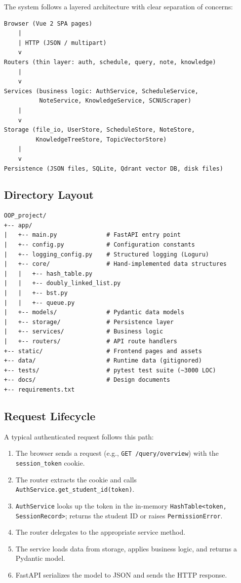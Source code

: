 \documentclass[12pt,a4paper]{article}
\begin{document}
The system follows a layered architecture with clear separation of concerns:

\begin{verbatim}
Browser (Vue 2 SPA pages)
    |
    | HTTP (JSON / multipart)
    v
Routers (thin layer: auth, schedule, query, note, knowledge)
    |
    v
Services (business logic: AuthService, ScheduleService,
          NoteService, KnowledgeService, SCNUScraper)
    |
    v
Storage (file_io, UserStore, ScheduleStore, NoteStore,
         KnowledgeTreeStore, TopicVectorStore)
    |
    v
Persistence (JSON files, SQLite, Qdrant vector DB, disk files)
\end{verbatim}

\subsection{Directory Layout}

\begin{lstlisting}[language={},caption={Project directory structure}]
OOP_project/
+-- app/
|   +-- main.py              # FastAPI entry point
|   +-- config.py            # Configuration constants
|   +-- logging_config.py    # Structured logging (Loguru)
|   +-- core/                # Hand-implemented data structures
|   |   +-- hash_table.py
|   |   +-- doubly_linked_list.py
|   |   +-- bst.py
|   |   +-- queue.py
|   +-- models/              # Pydantic data models
|   +-- storage/             # Persistence layer
|   +-- services/            # Business logic
|   +-- routers/             # API route handlers
+-- static/                  # Frontend pages and assets
+-- data/                    # Runtime data (gitignored)
+-- tests/                   # pytest test suite (~3000 LOC)
+-- docs/                    # Design documents
+-- requirements.txt
\end{lstlisting}

\subsection{Request Lifecycle}

A typical authenticated request follows this path:
\begin{enumerate}[nosep]
    \item The browser sends a request (e.g., \texttt{GET /query/overview}) with the \texttt{session\_token} cookie.
    \item The router extracts the cookie and calls \texttt{AuthService.get\_student\_id(token)}.
    \item \texttt{AuthService} looks up the token in the in-memory \texttt{HashTable<token, SessionRecord>}; returns the student ID or raises \texttt{PermissionError}.
    \item The router delegates to the appropriate service method.
    \item The service loads data from storage, applies business logic, and returns a Pydantic model.
    \item FastAPI serializes the model to JSON and sends the HTTP response.
\end{enumerate}
\end{document}
